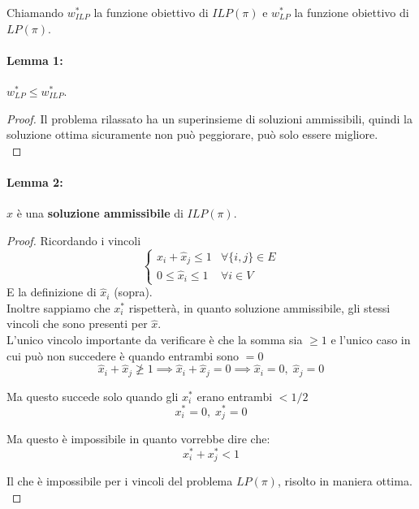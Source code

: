 Chiamando $w^\ast_{ILP}$ la funzione obiettivo di $ILP(\pi)$ e $w^\ast_{LP}$ la funzione obiettivo di $LP(\pi)$.\\

\paragraph{Lemma 1:} $w^\ast_{LP} \leq w^\ast_{ILP}$.\\

\begin{proof}
	Il problema rilassato ha un superinsieme di soluzioni ammissibili, quindi la soluzione ottima sicuramente non può peggiorare, può solo essere migliore.\\
\end{proof}

\paragraph{Lemma 2:} $\hat{x}$ è una \textbf{soluzione ammissibile} di $ILP(\pi)$.\\

\begin{proof}
	Ricordando i vincoli
	$$\begin{cases}
		\hat{x}_i + \hat{x}_j \leq 1 & \forall \{i,j\} \in E \\
		0 \leq \hat{x}_i \leq 1 & \forall i \in V
	\end{cases}
	$$
	E la definizione di $\hat{x}_i$ (sopra).\\
	
	Inoltre sappiamo che $x^\ast_i$ rispetterà, in quanto soluzione ammissibile, gli stessi vincoli che sono presenti per $\hat{x}$.\\
	
	L'unico vincolo importante da verificare è che la somma sia $\geq 1$ e l'unico caso in cui può non succedere è quando entrambi sono $=0$ 
	$$ \hat{x}_i + \hat{x}_j \ngeq 1 \implies \hat{x}_i + \hat{x}_j = 0 \implies \hat{x}_i = 0, \; \hat{x}_j = 0  $$
	
	Ma questo succede solo quando gli $x_i^\ast$ erano entrambi $< 1/2$
	$$ x_i^\ast = 0, \; x_j^\ast = 0$$
	
	Ma questo è impossibile in quanto vorrebbe dire che:
	$$ x_i^\ast + x_j^\ast < 1 $$
	
	Il che è impossibile per i vincoli del problema $LP(\pi)$, risolto in maniera ottima.\\
\end{proof}

